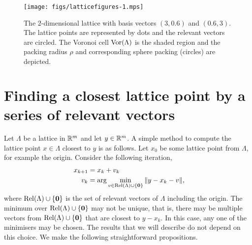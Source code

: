 \documentclass[final,leqno]{siamltex}
\begin{document}
 
\begin{figure}[tp] 
	\centering      
		\texttt{[image: figs/latticefigures-1.mps]} 
		\caption{The $2$-dimensional lattice with basis vectors $(3,0.6)$ and $(0.6,3)$.  The lattice points are represented by dots and the relevant vectors are circled.  The Voronoi cell $\operatorname{Vor}(\Lambda)$ is the shaded region and the packing radius $\rho$ and corresponding sphere packing (circles) are depicted.
}     
		\label{lattices:fig:vorregion}   
\end{figure} 



\section{Finding a closest lattice point by a series of relevant vectors} \label{sec:iterative-slicer}

Let $\Lambda$ be a lattice in ${\mathbb R}^m$ and let $y \in {\mathbb R}^m$. A simple method to compute the lattice point $x \in \Lambda$ closest to $y$ is as follows.  Let $x_0$ be some lattice point from $\Lambda$, for example the origin.  Consider the following iteration,
\begin{align}\
x_{k+1} &= x_k + v_k \nonumber \\
v_k &= \arg\min_{ v \in \relevant(\Lambda) \cup \{\zerobf\} } \|y - x_k - v \|, \label{eq:relvectsminimslicer}
\end{align} 
where $\operatorname{Rel}(\Lambda) \cup \{\boldsymbol{0}\}$ is the set of relevant vectors of $\Lambda$ including the origin.  The minimum over $\operatorname{Rel}(\Lambda) \cup \{\boldsymbol{0}\}$ may not be unique, that is, there may be multiple vectors from $\operatorname{Rel}(\Lambda) \cup \{\boldsymbol{0}\}$ that are closest to $y - x_k$.  In this case, any one of the minimisers may be chosen.  The results that we will describe do not depend on this choice. We make the following straightforward propositions.
\end{document}
